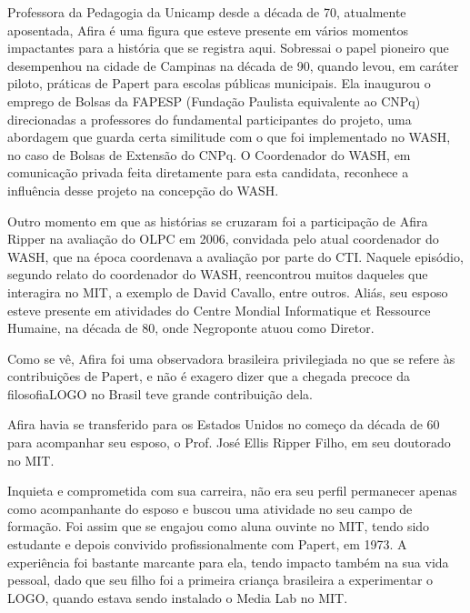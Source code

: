 \documentclass[
12pt,		%
openright,	%
twoside,  %
a4paper,			%
chapter=TITLE,		%
english,			%
french,				%
spanish,			%
brazil				%
]{USPSC-classe/USPSC}
\begin{document}
Professora da Pedagogia da Unicamp desde a d\'ecada de 70, atualmente aposentada, Afira \'e uma figura que esteve presente em v\'arios momentos impactantes para a hist\'oria que se registra aqui. Sobressai o papel pioneiro que  desempenhou na cidade de Campinas na d\'ecada de 90, quando levou, em car\'ater piloto, pr\'aticas de Papert para escolas p\'ublicas municipais. Ela inaugurou o emprego de Bolsas da FAPESP (Funda\c{c}\~ao Paulista equivalente ao CNPq) direcionadas a professores do fundamental participantes do projeto, uma abordagem que guarda certa similitude com o que foi implementado no WASH, no caso de Bolsas de Extens\~ao do CNPq. O Coordenador do WASH, em comunica\c{c}\~ao privada feita diretamente para esta candidata, reconhece a influ\^encia desse projeto na concep\c{c}\~ao do WASH.




Outro momento em que as hist\'orias se cruzaram foi a participa\c{c}\~ao de Afira Ripper na avalia\c{c}\~ao do OLPC em 2006, convidada pelo atual coordenador do WASH, que na \'epoca coordenava a avalia\c{c}\~ao por parte do CTI. Naquele epis\'odio, segundo relato do coordenador do WASH, reencontrou muitos daqueles que interagira no MIT, a exemplo de David Cavallo, entre outros. Ali\'as, seu esposo esteve presente em atividades do Centre Mondial Informatique et Ressource Humaine, na d\'ecada de 80, onde Negroponte atuou como Diretor.




Como se v\^e, Afira foi uma observadora brasileira privilegiada no que se refere \`as contribui\c{c}\~oes de Papert, e n\~ao \'e exagero dizer que a chegada precoce da \textquotedbl filosofia\textquotedbl  LOGO no Brasil teve grande contribui\c{c}\~ao dela.




Afira havia se transferido para os Estados Unidos no come\c{c}o da d\'ecada de 60 para acompanhar seu esposo, o Prof. Jos\'e Ellis Ripper Filho, em seu doutorado no MIT.




Inquieta e comprometida com sua carreira, n\~ao era seu perfil permanecer apenas como acompanhante do esposo e buscou uma atividade no seu campo de forma\c{c}\~ao. Foi assim que se engajou como aluna ouvinte no MIT, tendo sido estudante e depois convivido profissionalmente com Papert, em 1973. A experi\^encia foi bastante marcante para ela, tendo impacto tamb\'em na sua vida pessoal, dado que seu filho foi a primeira crian\c{c}a brasileira a experimentar o LOGO, quando estava sendo instalado o Media Lab no MIT.
\end{document}
